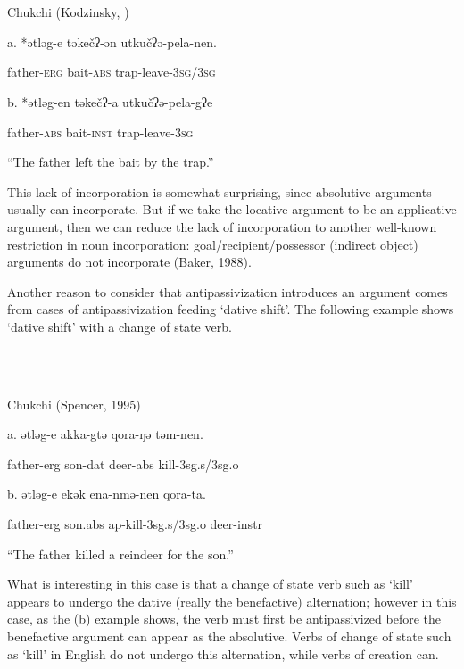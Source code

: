 \documentclass[output=paper,modfonts,nonflat]{langsci/langscibook}
\begin{document}
\ea%
    \label{ex:key:12}
    \gll\\
        \\
    \glt
    \z

          Chukchi (Kodzinsky, \citealt{NedjalkovPolinskaja1988})

a.  *ətləg-e   təkečʔ-ən  utkučʔə-pela-nen.

  father{}-\textsc{erg}   bait-\textsc{abs}   trap-leave{}-3\textsc{sg}/3\textsc{sg}

b.    *ətləg-en   təkečʔ-a  utkučʔə-pela-gʔe

  father-\textsc{abs}  bait-\textsc{inst}  trap-leave-3\textsc{sg}

“The father left the bait by the trap.”

This lack of incorporation is somewhat surprising, since absolutive arguments usually can incorporate.  But if we take the locative argument to be an applicative argument, then we can reduce the lack of incorporation to another well-known restriction in noun incorporation: goal/recipient/possessor (indirect object) arguments do not incorporate (Baker, 1988).

Another reason to consider that antipassivization introduces an argument comes from cases of antipassivization feeding ‘dative shift’.  The following example shows ‘dative shift’ with a change of state verb.

\ea%
    \label{ex:key:13}
    \gll\\
        \\
    \glt
    \z

          Chukchi (Spencer, 1995)

a.  ǝtlǝg-e  akka-gtǝ  qora-ŋǝ  tǝm-nen.

  father{}-erg  son{}-dat  deer{}-abs  kill-3sg.s/3sg.o

b.    ǝtlǝg-e  ekǝk    ena-nmǝ-nen    qora-ta.  

  father-erg  son.abs  ap{}-kill-3sg.s/3sg.o  deer-instr

  “The father killed a reindeer for the son.”

What is interesting in this case is that a change of state verb such as ‘kill’ appears to undergo the dative (really the benefactive) alternation; however in this case, as the (b) example shows, the verb must first be antipassivized before the benefactive argument can appear as the absolutive.   Verbs of change of state such as ‘kill’ in English do not undergo this alternation, while verbs of creation can.

\ea%
    \label{ex:key:14}
    \gll\\
        \\
    \glt
    \z
\end{document}
